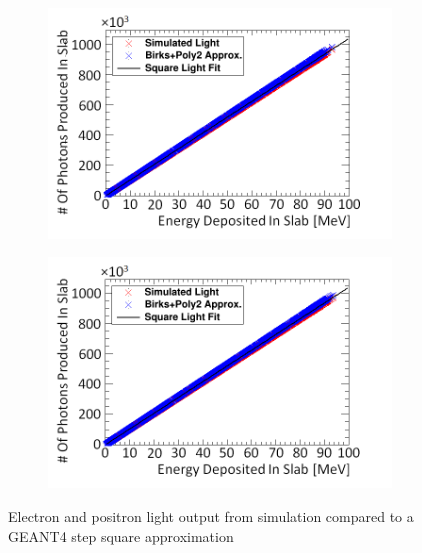 \begin{figure}[!h]
\centering
\begin{subfigure}{.5\textwidth}
  \centering
  \includegraphics[width=\linewidth]{Chapter4/Figs/Raster/electronSimulatedLightBirksAndPoly2New.png}
  \captionsetup{width=.9\linewidth}
  \caption{}
  \label{subFig:square_electron_light}
\end{subfigure}%
\begin{subfigure}{.5\textwidth}
  \centering
  \includegraphics[width=\linewidth]{Chapter4/Figs/Raster/positronSimulatedLightBirksAndPoly2New.png}
  \captionsetup{width=.9\linewidth}
  \caption{}
  \label{subFig:square_positron_light}
\end{subfigure}
\caption{Electron and positron light output from simulation compared to a GEANT4 step square approximation}
\label{fig:square_electron_positron_light}
\end{figure}

